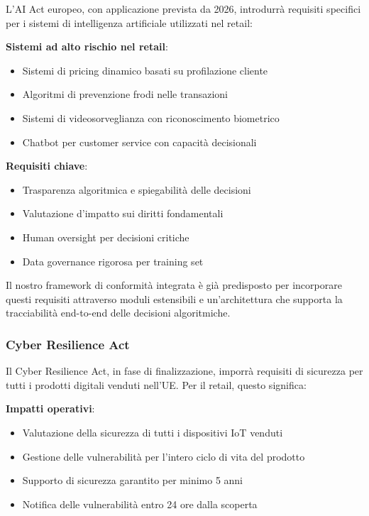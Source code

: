 L'AI Act europeo, con applicazione prevista da 2026, introdurrà requisiti specifici per i sistemi di intelligenza artificiale utilizzati nel retail:

\textbf{Sistemi ad alto rischio nel retail}:
\begin{itemize}
    \item Sistemi di pricing dinamico basati su profilazione cliente
    \item Algoritmi di prevenzione frodi nelle transazioni
    \item Sistemi di videosorveglianza con riconoscimento biometrico
    \item Chatbot per customer service con capacità decisionali
\end{itemize}

\textbf{Requisiti chiave}:
\begin{itemize}
    \item Trasparenza algoritmica e spiegabilità delle decisioni
    \item Valutazione d'impatto sui diritti fondamentali
    \item Human oversight per decisioni critiche
    \item Data governance rigorosa per training set
\end{itemize}

Il nostro framework di conformità integrata è già predisposto per incorporare questi requisiti attraverso moduli estensibili e un'architettura che supporta la tracciabilità end-to-end delle decisioni algoritmiche.

\subsubsection{Cyber Resilience Act}

Il Cyber Resilience Act, in fase di finalizzazione, imporrà requisiti di sicurezza per tutti i prodotti digitali venduti nell'UE. Per il retail, questo significa:

\textbf{Impatti operativi}:
\begin{itemize}
    \item Valutazione della sicurezza di tutti i dispositivi IoT venduti
    \item Gestione delle vulnerabilità per l'intero ciclo di vita del prodotto
    \item Supporto di sicurezza garantito per minimo 5 anni
    \item Notifica delle vulnerabilità entro 24 ore dalla scoperta
\end{itemize}

